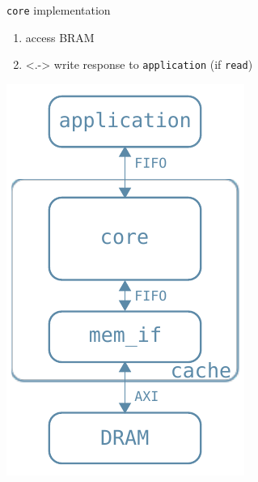 \documentclass[handout]{beamer}
\begin{document}
\begin{frame}{\texttt{core} implementation}
\begin{minipage}{.7\textwidth}
\begin{enumerate}[<+->]
\begin{itemize}
				\end{itemize}
			\item access BRAM
			\item<.-> write response to \texttt{application}
				(if \texttt{read})
		\end{enumerate}
	\end{minipage}
	\begin{minipage}{.28\textwidth}
		\begin{center}
			\includegraphics[width=.9\textwidth]{internal_arch.pdf}
		\end{center}
	\end{minipage}
\end{frame}
\end{document}
